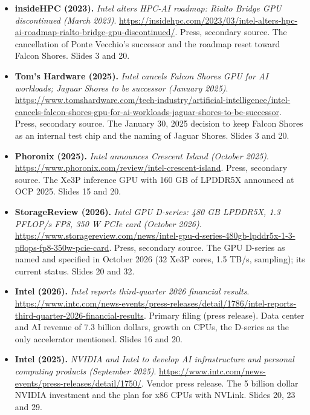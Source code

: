 \documentclass[11pt,letterpaper]{article}
\begin{document}
\begin{itemize}[leftmargin=1.2em,itemsep=3pt]
\item \textbf{insideHPC (2023).} \textit{Intel alters HPC-AI roadmap: Rialto Bridge GPU discontinued (March 2023)}. \url{https://insidehpc.com/2023/03/intel-alters-hpc-ai-roadmap-rialto-bridge-gpu-discontinued/}. Press, secondary source. The cancellation of Ponte Vecchio's successor and the roadmap reset toward Falcon Shores. Slides 3 and 20.
\item \textbf{Tom's Hardware (2025).} \textit{Intel cancels Falcon Shores GPU for AI workloads; Jaguar Shores to be successor (January 2025)}. \url{https://www.tomshardware.com/tech-industry/artificial-intelligence/intel-cancels-falcon-shores-gpu-for-ai-workloads-jaguar-shores-to-be-successor}. Press, secondary source. The January 30, 2025 decision to keep Falcon Shores as an internal test chip and the naming of Jaguar Shores. Slides 3 and 20.
\item \textbf{Phoronix (2025).} \textit{Intel announces Crescent Island (October 2025)}. \url{https://www.phoronix.com/review/intel-crescent-island}. Press, secondary source. The Xe3P inference GPU with 160 GB of LPDDR5X announced at OCP 2025. Slides 15 and 20.
\item \textbf{StorageReview (2026).} \textit{Intel GPU D-series: 480 GB LPDDR5X, 1.3 PFLOP/s FP8, 350 W PCIe card (October 2026)}. \url{https://www.storagereview.com/news/intel-gpu-d-series-480gb-lpddr5x-1-3-pflops-fp8-350w-pcie-card}. Press, secondary source. The GPU D-series as named and specified in October 2026 (32 Xe3P cores, 1.5 TB/s, sampling); its current status. Slides 20 and 32.
\item \textbf{Intel (2026).} \textit{Intel reports third-quarter 2026 financial results}. \url{https://www.intc.com/news-events/press-releases/detail/1786/intel-reports-third-quarter-2026-financial-results}. Primary filing (press release). Data center and AI revenue of 7.3 billion dollars, growth on CPUs, the D-series as the only accelerator mentioned. Slides 16 and 20.
\item \textbf{Intel (2025).} \textit{NVIDIA and Intel to develop AI infrastructure and personal computing products (September 2025)}. \url{https://www.intc.com/news-events/press-releases/detail/1750/}. Vendor press release. The 5 billion dollar NVIDIA investment and the plan for x86 CPUs with NVLink. Slides 20, 23 and 29.
\end{itemize}
\end{document}
